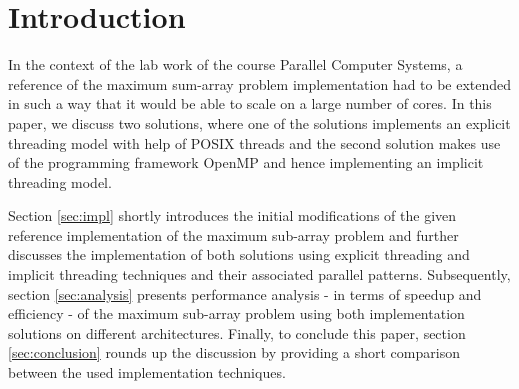 \documentclass[conference]{IEEEtran}
\begin{document}






%
\IEEEpeerreviewmaketitle



\section{Introduction}
In the context of the lab work of the course Parallel Computer Systems, a reference of the maximum sum-array problem implementation had to be extended in such a way that it would be able to scale on a large number of cores. In this paper, we discuss two solutions, where one of the solutions implements an explicit threading model with help of POSIX threads and the second solution makes use of the programming framework OpenMP and hence implementing an implicit threading model. 

Section \ref{sec:impl} shortly introduces the initial modifications of the given reference implementation of the maximum sub-array problem and further discusses the implementation of both solutions using explicit threading and implicit threading techniques and their associated parallel patterns. Subsequently, section \ref{sec:analysis} presents performance analysis - in terms of speedup and efficiency - of the maximum sub-array problem using both implementation solutions on different architectures. Finally, to conclude this paper, section \ref{sec:conclusion} rounds up the discussion by providing a short comparison between the used implementation techniques. 
\end{document}
